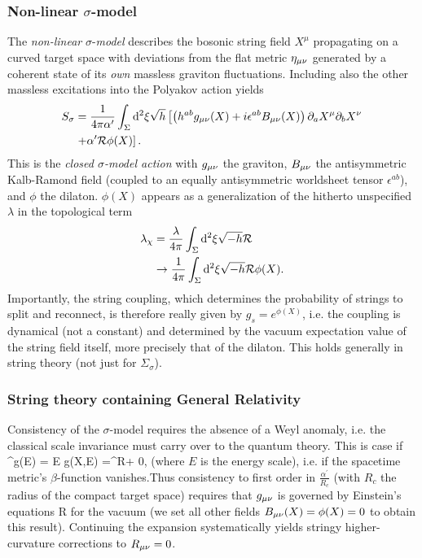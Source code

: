 \subsubsection{Non-linear $\sigma$-model}
The \emph{non-linear }$\sigma$-\emph{model} describes the bosonic string field $X^\mu$ propagating on a curved target space with deviations from the flat metric $\eta_{\mu \nu}$ generated by a coherent state of its \emph{own} massless graviton fluctuations. Including also the other massless excitations into the Polyakov action yields
\begin{align}
\label{eq:stringSigmaAction}
S_\sigma &= \frac{1}{4 \pi \alpha^\prime} \int_\Sigma \mathrm{d}^2 \xi \sqrt{h} \left[ \left(h^{ab}g_{\mu \nu} (X) + i \epsilon^{ab} B_{\mu \nu} (X) \right) \partial_a X^\mu \partial_b X^\nu \right. \nonumber \\
&\left.+ \alpha^\prime \mathcal{R}\phi(X) \right]. 
\end{align}
This is the \emph{closed $\sigma$-model action} with $g_{\mu \nu}$ the graviton, $B_{\mu \nu}$ the antisymmetric Kalb-Ramond field (coupled to an equally antisymmetric worldsheet tensor $\epsilon^{ab}$), and $\phi$ the dilaton. $\phi(X)$  appears as a generalization of the hitherto unspecified $\lambda$ in the topological term
\begin{align*}
\lambda_\chi &= \frac{\lambda }{4 \pi} \int_\Sigma \mathrm{d}^2 \xi \sqrt{-h} \mathcal{R}\\
&\rightarrow \frac{1}{4 \pi} \int_\Sigma \mathrm{d}^2 \xi \sqrt{-h} \mathcal{R} \phi(X). 
\end{align*}
Importantly, the string coupling, which determines the probability of strings to split and reconnect, is therefore really given by $g_s =e^{\phi(X)}$, i.e. the coupling is dynamical (not a constant) and determined by the vacuum expectation value of the string field itself, more precisely that of the dilaton. This holds generally in string theory (not just for $\Sigma_\sigma$).
\subsubsection{String theory containing General Relativity }
Consistency of the $\sigma$-model requires the absence of a Weyl anomaly, i.e. the classical scale invariance must carry over to the quantum theory. This is case if
\be 
	\beta^g\munu(E) = E g\munu (X,E) =\alpha^\prime R\munu +  \stackrel{!}{=} 0,
\ee
(where $E$ is the energy scale), i.e. if the spacetime metric's $\beta$-function vanishes.Thus consistency to first order in $\frac{\alpha^\prime}{R_c}$ (with $R_c$ the radius of the compact target space) requires that $g_{\mu \nu}$ is governed by Einstein's equations 
\bse 
R 
\ese 
for the vacuum (we set all other fields $B_{\mu \nu}(X)=\phi(X)=0$ to obtain this result). Continuing the expansion systematically yields stringy higher-curvature corrections to $R_{\mu \nu}=0$.

